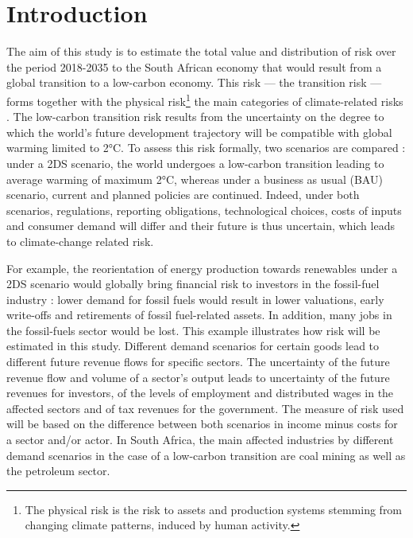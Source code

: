 \documentclass[12pt,english]{article}
\begin{document}
\begin{abstract}


\end{abstract}

\tableofcontents

\section{Introduction}

The aim of this study is to estimate %
the total value and distribution of risk over the period 2018-2035 to the South African economy that would result from a global transition to a low-carbon economy. This risk --- the transition risk --- forms together with the physical risk\footnote{The physical risk is the risk to assets and production systems stemming from changing climate patterns, induced by human activity.} the main categories of climate-related risks %
\citep{board2017recommendations}. The low-carbon transition risk results from the uncertainty on the degree to which the world's future development trajectory will be compatible with global warming limited to 2°C. To assess this risk formally, two scenarios are compared : under a 2DS scenario, the world undergoes a low-carbon transition leading to average warming of maximum 2°C, whereas under a business as usual (BAU) scenario, current and planned policies are continued. Indeed, under both scenarios, regulations, reporting obligations, technological choices, costs of inputs and consumer demand will differ and their future is thus uncertain, which leads to climate-change related risk. %

For example, the reorientation of energy production towards renewables under a 2DS scenario would globally bring financial risk to investors in the fossil-fuel industry : lower demand for fossil fuels would result in lower valuations, early write-offs and retirements of fossil fuel-related assets. In addition, many jobs in the fossil-fuels sector would be lost. This example illustrates how risk will be estimated in this study. Different demand scenarios for certain goods lead to different future revenue flows for specific sectors. The uncertainty of the future revenue flow and volume of a sector's output leads to uncertainty of the future revenues for investors, of the levels of employment and distributed wages in the affected sectors and of tax revenues for the government. The measure of risk used will be based on the difference between both scenarios in income minus costs for a sector and/or actor. In South Africa, the main affected industries by different demand scenarios in the case of a low-carbon transition are coal mining %
as well as the petroleum sector.
\end{document}

